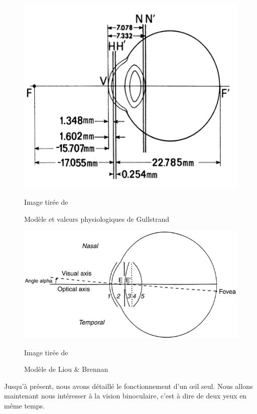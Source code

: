 	\begin{figure}[h]
		\centering
		\includegraphics[scale=1.25]{Figures/GullstrandModel}
		\caption{Modèle et valeurs physiologiques de Gullstrand}{Image tirée de \citep{liou_anatomically_1997}}
		\label{fig:modele_gullstrand}
	\end{figure}
	
	\begin{figure}[h]
		\centering
		\includegraphics[scale=1]{Figures/LiouBrennanModel}
		\caption{Modèle de Liou \& Brennan}{Image tirée de \citep{liou_anatomically_1997}}
		\label{fig:modele_liou_brennan}
	\end{figure}
	
	\par Jusqu'à présent, nous avons détaillé le fonctionnement d'un œil seul. Nous allons maintenant nous intéresser à la vision binoculaire, c'est à dire de deux yeux en même temps.
	
